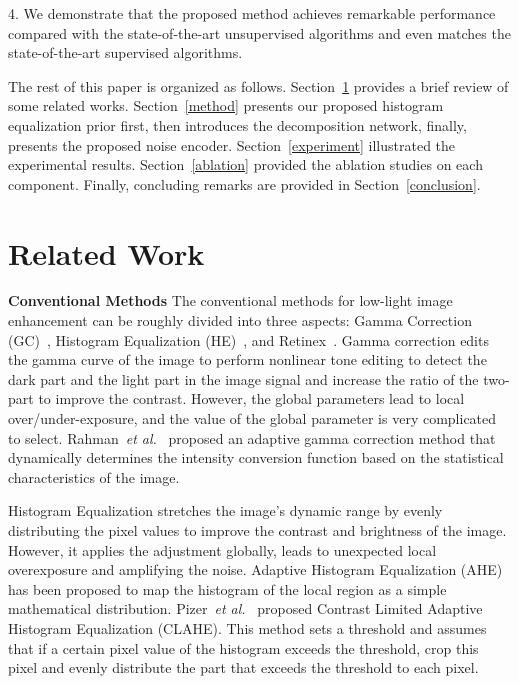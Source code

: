\documentclass[journal]{IEEEtran}
\newcommand{\etal}{{\emph{et al.}}}
\begin{document}
4. We demonstrate that the proposed method achieves remarkable performance compared with the state-of-the-art unsupervised algorithms and even matches the state-of-the-art supervised algorithms.


The rest of this paper is organized as follows. Section~\ref{related} provides a brief review of some related works. Section~\ref{method} presents our proposed histogram equalization prior first, then introduces the decomposition network, finally, presents the proposed noise encoder. Section~\ref{experiment} illustrated the experimental results. Section~\ref{ablation} provided the ablation studies on each component. Finally, concluding remarks are provided in Section~\ref{conclusion}.

\section{Related Work}
\label{related}
\textbf{Conventional Methods} The conventional methods for low-light image enhancement can be roughly divided into three aspects: Gamma Correction (GC)~\cite{farid2001blind}, Histogram Equalization (HE)~\cite{pizer1990contrast}, and Retinex~\cite{land1971lightness}. Gamma correction edits the gamma curve of the image to perform nonlinear tone editing to detect the dark part and the light part in the image signal and increase the ratio of the two-part to improve the contrast. However, the global parameters lead to local over/under-exposure, and the value of the global parameter is very complicated to select. Rahman~\etal~\cite{rahman2016adaptive} proposed an adaptive gamma correction method that dynamically determines the intensity conversion function based on the statistical characteristics of the image. 

Histogram Equalization stretches the image's dynamic range by evenly distributing the pixel values to improve the contrast and brightness of the image. However, it applies the adjustment globally, leads to unexpected local overexposure and amplifying the noise. Adaptive Histogram Equalization (AHE)~\cite{pizer1987adaptive} has been proposed to map the histogram of the local region as a simple mathematical distribution. Pizer~\etal~\cite{pizer1990contrast} proposed Contrast Limited Adaptive Histogram Equalization (CLAHE). This method sets a threshold and assumes that if a certain pixel value of the histogram exceeds the threshold, crop this pixel and evenly distribute the part that exceeds the threshold to each pixel. 
\end{document}

